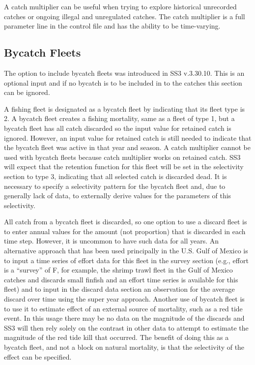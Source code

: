 A catch multiplier can be useful when trying to explore historical unrecorded catches or ongoing illegal and unregulated catches.  The catch multiplier is a full parameter line in the control file and has the ability to be time-varying.  

\subsection{Bycatch Fleets}
The option to include bycatch fleets was introduced in SS3 v.3.30.10.  This is an optional input and if no bycatch is to be included in to the catches this section can be ignored.

A fishing fleet is designated as a bycatch fleet by indicating that its fleet type is 2.  A bycatch fleet creates a fishing mortality, same as a fleet of type 1, but a bycatch fleet has all catch discarded so the input value for retained catch is ignored.  However, an input value for retained catch is still needed to indicate that the bycatch fleet was active in that year and season.  A catch multiplier cannot be used with bycatch fleets because catch multiplier works on retained catch.  SS3 will expect that the retention function for this fleet will be set in the selectivity section to type 3, indicating that all selected catch is discarded dead.  It is necessary to specify a selectivity pattern for the bycatch fleet and, due to generally lack of data, to externally derive values for the parameters of this selectivity.

All catch from a bycatch fleet is discarded, so one option to use a discard fleet is to enter annual values for the amount (not proportion) that is discarded in each time step.  However, it is uncommon to have such data for all years.  An alternative approach that has been used principally in the U.S. Gulf of Mexico is to input a time series of effort data for this fleet in the survey section (e.g.,  effort is a ``survey'' of F, for example, the shrimp trawl fleet in the Gulf of Mexico catches and discards small finfish and an effort time series is available for this fleet) and to input in the discard data section an observation for the average discard over time using the super year approach.  Another use of bycatch fleet is to use it to estimate effect of an external source of mortality, such as a red tide event.  In this usage there may be no data on the magnitude of the discards and SS3 will then rely solely on the contrast in other data to attempt to estimate the magnitude of the red tide kill that occurred. The benefit of doing this as a bycatch fleet, and not a block on natural mortality, is that the selectivity of the effect can be specified. 

